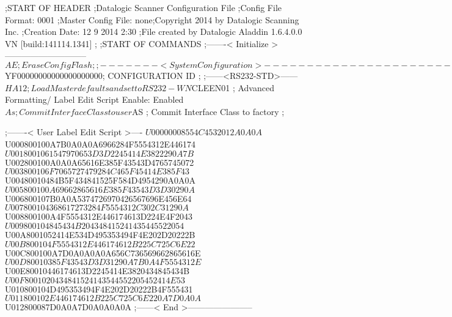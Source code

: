 ;START OF HEADER
;Datalogic Scanner Configuration File
;Config File Format: 0001
;Master Config File: none;Copyright 2014 by Datalogic Scanning Inc.
;Creation Date: 12 9 2014 2:30
;File created by Datalogic Aladdin 1.6.4.0.0 VN [build:141114.1341]
;
;START OF COMMANDS
;-------< Initialize >-----------------------------
$AE                 ; Erase Config Flash
;
;-------< System Configuration >-------------------------------
$YF00000000000000000000; CONFIGURATION ID
;
;------<RS232-STD>------
$HA12               ; Load Master defaults and set to RS232-WN
$CLEEN01            ; Advanced Formatting/ Label Edit Script Enable: Enabled
$As                 ; Commit Interface Class to user
$AS                 ; Commit Interface Class to factory
;

;-------< User Label Edit Script >----
$U00000008554C4532012A0A0A
$U000800100A7B0A0A0A6966284F5554312E446174
$U0018001061547970653D3D2245414E3822290A7B
$U002800100A0A0A65616E385F43543D4765745072
$U003800106F7065727479284C465F45414E385F43
$U00480010484B5F434841525F584D4954290A0A0A
$U005800100A69662865616E385F43543D3D30290A
$U006800107B0A0A5374726970426567696E456E64
$U007800104368617273284F5554312C302C31290A
$U008800100A4F5554312E446174613D224E4F2043
$U009800104845434B204348415241435445522054
$U00A8001052414E534D495353494F4E202D20222B
$U00B800104F5554312E446174612B225C725C6E22
$U00C800100A7D0A0A0A0A656C736569662865616E
$U00D80010385F43543D3D31290A7B0A4F5554312E
$U00E80010446174613D2245414E3820434845434B
$U00F8001020434841524143544552205452414E53
$U010800104D495353494F4E202D20222B4F555431
$U011800102E446174612B225C725C6E220A7D0A0A
$U012800087D0A0A7D0A0A0A0A
;------< End >-----------------------
